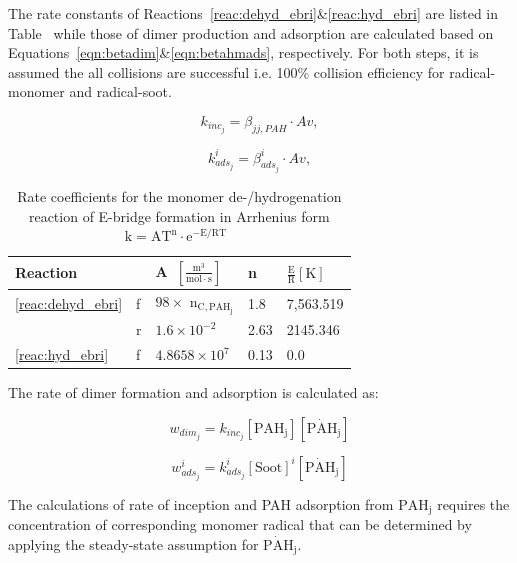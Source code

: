The rate constants of Reactions~\eqref{reac:dehyd_ebri}\&\eqref{reac:hyd_ebri} are listed in Table~\citep{tab:Ebridge} while those of dimer production and adsorption are calculated based on Equations~\eqref{eqn:betadim}\&\eqref{eqn:betahmads}, respectively. For both steps, it is assumed the all collisions are successful i.e. 100\% collision efficiency for radical-monomer and radical-soot.

\begin{equation}
	k_{inc_j}=
	\beta_{jj,PAH}\cdot Av
	\label{eqn:kdim_ebri},
\end{equation}

\begin{equation}
	k^i_{ads_{j}}=
	\beta^i_{ads_j}\cdot Av
	\label{eqn:kads_ebir},
\end{equation}

\begin{table}
	\caption{Rate coefficients for the monomer de-/hydrogenation reaction of E-bridge formation in Arrhenius form $\mathrm{k=AT^n\cdot e^{-E/RT}}$~\citep{frenklach2020mechanism}}
	\label{tab:Ebridge}
	\centering
	\begin{tabular}{l l l l l}
		\hline
		Reaction & \hspace{0.1cm} & A~$\mathrm{\left[ \frac{m^3}{mol\cdot s} \right]}$ & n & $\mathrm{\frac{E}{R} [K]}$  \\
		\hline
		\eqref{reac:dehyd_ebri} & f & $98\times$ $\mathrm{n_{C, PAH_j}}$ & 1.8 & 7,563.519 \\
		  & r & $1.6\times 10^{-2}$ & 2.63 & 2145.346\\
		\eqref{reac:hyd_ebri} & f & $4.8658\times10^7
		$ & 0.13 & 0.0\\
		\hline
	\end{tabular}
\end{table}

The rate of dimer formation and adsorption is calculated as:

\begin{equation}
	w_{dim_j} = k_{inc_{j}} [\mathrm{PAH_j}] [\mathrm{\dot{PAH}_j}]
	\label{eqn:wdim_ebri}
\end{equation}

\begin{equation}
	w^i_{ads_j} = k^i_{ads_{j}} [\mathrm{Soot}]^i [\mathrm{\dot{PAH}_j}]
\end{equation}

The calculations of rate of inception and PAH adsorption from $\mathrm{PAH_j}$ requires the concentration of corresponding monomer radical that can be determined by applying the steady-state assumption for $\mathrm{\dot{PAH}_j}$.

